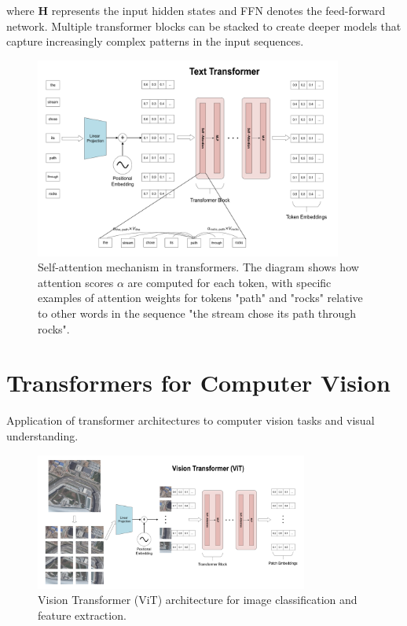 where $\mathbf{H}$ represents the input hidden states and FFN denotes the feed-forward network. Multiple transformer blocks can be stacked to create deeper models that capture increasingly complex patterns in the input sequences.

\begin{figure}[tb]
\centering
\includegraphics[width=0.9\textwidth]{Images/transformer.png}
\caption{Self-attention mechanism in transformers. The diagram shows how attention scores $\alpha$ are computed for each token, with specific examples of attention weights for tokens "path" and "rocks" relative to other words in the sequence "the stream chose its path through rocks".}
\label{fig:transformer}
\end{figure}

\section{Transformers for Computer Vision}

Application of transformer architectures to computer vision tasks and visual understanding.

\begin{figure}[htbp]
\centering
\includegraphics[width=0.8\textwidth]{Images/vit.png}
\caption{Vision Transformer (ViT) architecture for image classification and feature extraction.}
\label{fig:vit}
\end{figure}

